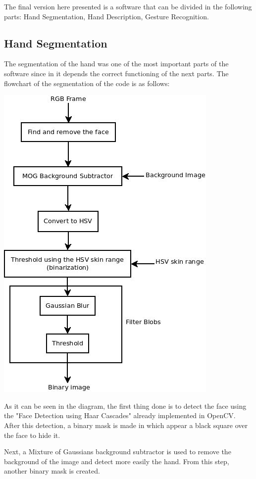 \documentclass{article}
\begin{document}
The final version here presented is a software that can be divided in the following parts: Hand Segmentation, Hand Description, Gesture Recognition.

\subsection{Hand Segmentation}
The segmentation of the hand was one of the most important parts of the software since in it depends the correct functioning of the next parts. 
The flowchart of the segmentation of the code is as follows: 

\begin{center}
 \includegraphics[scale=0.4]{../hand_filter.jpeg} 
 \end{center} 
 
As it can be seen in the diagram, the first thing done is to detect the face using the "Face Detection using Haar Cascades" already implemented in OpenCV. After this detection, a binary mask is made in which appear a black square over the face to hide it.

Next, a Mixture of Gaussians background subtractor is used to remove the background of the image and detect more easily the hand. From this step, another binary mask is created. 
\end{document}
